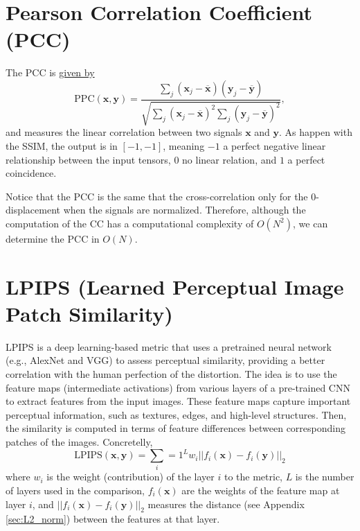 
\section{Pearson Correlation Coefficient (PCC)}

The \gls{PCC} is
\href{https://en.wikipedia.org/wiki/Pearson_correlation_coefficient}{given
  by}
\begin{equation}
  \text{PPC}(\mathbf{x}, \mathbf{y}) = \frac{\sum_j(\mathbf{x}_j - \overline{\mathbf{x}})(\mathbf{y}_j - \overline{\mathbf{y}})}{\sqrt{\sum_j (\mathbf{x}_j - \overline{\mathbf{x}})^2 \sum_j (\mathbf{y}_j - \overline{\mathbf{y}})^2}},
\end{equation}
and measures the linear correlation between two signals $\mathbf{x}$
and $\mathbf{y}$.  As happen with the SSIM, the output is in
$[-1, -1]$, meaning $-1$ a perfect negative linear relationship
between the input tensors, $0$ no linear relation, and $1$ a perfect
coincidence.

Notice that the \gls{PCC} is the same that the cross-correlation
only for the 0-displacement when the signals are normalized. Therefore,
although the computation of the \gls{CC} has a computational complexity of
$O(N^2)$, we can determine the \gls{PCC} in $O(N)$.


\section{LPIPS (Learned Perceptual Image Patch Similarity)}

LPIPS \cite{zhang2018unreasonable} is a deep learning-based metric that
uses a pretrained neural network (e.g., AlexNet and VGG) to assess
perceptual similarity, providing a better correlation with the human
perfection of the distortion. The idea is to use the feature maps
(intermediate activations) from various layers of a pre-trained CNN to
extract features from the input images. These feature maps capture
important perceptual information, such as textures, edges, and
high-level structures. Then, the similarity is computed in terms of
feature differences between corresponding patches of the
images. Concretelly,
\begin{equation}
  \text{LPIPS}(\mathbf{x}, \mathbf{y}) = \sum_i=1^Lw_i||f_i(\mathbf{x}) - f_i(\mathbf{y})||_2
\end{equation}
where $w_i$ is the weight (contribution) of the layer $i$ to the
metric, $L$ is the number of layers used in the comparison,
$f_i(\mathbf{x})$ are the weights of the feature map at layer $i$, and
$||f_i(\mathbf{x}) - f_i(\mathbf{y})||_2$ measures the distance (see
Appendix \ref{sec:L2_norm}) between the features at that layer.

